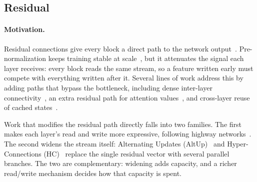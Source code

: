 
\subsection{Residual}
\label{sec:residual}

\paragraph{Motivation.}
\label{sec:residual-motivation}
Residual connections give every block a direct path to the network output~\citep{he2016resnet}. 
Pre-normalization keeps training stable at scale~\citep{xiong2020layernorm}, but it attenuates the signal each layer receives: every block reads the same stream, so a feature written early must compete with everything written after it. 
Several lines of work address this by adding paths that bypass the bottleneck, including dense inter-layer connectivity~\citep{huang2017densenet}, an extra residual path for attention values~\citep{zhou2024valueresidual}, and cross-layer reuse of cached states~\citep{sun2024yoco}.

Work that modifies the residual path directly falls into two families. 
The first makes each layer's read and write more expressive, following highway networks~\citep{srivastava2015highway}. 
The second widens the stream itself: Alternating Updates (AltUp)~\citep{baykal2023altup} and Hyper-Connections (HC)~\citep{zhu2024hyper} replace the single residual vector with several parallel branches. 
The two are complementary: widening adds capacity, and a richer read/write mechanism decides how that capacity is spent.


